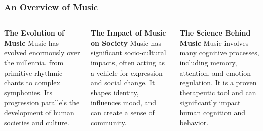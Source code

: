 \documentclass[5pt]{beamer}
\begin{document}
\begin{frame}
\frametitle{An Overview of Music}
\begin{columns}
\begin{column}{0.3\textwidth}
\begin{block}{\textbf{The Evolution of Music}}
Music has evolved enormously over the millennia, from primitive rhythmic chants to complex symphonies. Its progression parallels the development of human societies and culture.
\end{block}
\end{column}
\begin{column}{0.3\textwidth}
\begin{block}{\textbf{The Impact of Music on Society}}
Music has significant socio-cultural impacts, often acting as a vehicle for expression and social change. It shapes identity, influences mood, and can create a sense of community.
\end{block}
\end{column}
\begin{column}{0.3\textwidth}
\begin{block}{\textbf{The Science Behind Music}}
Music involves many cognitive processes, including memory, attention, and emotion regulation. It is a proven therapeutic tool and can significantly impact human cognition and behavior.
\end{block}
\end{column}
\end{columns}
\end{frame}
\end{document}
